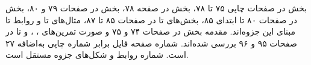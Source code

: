 بخش  در صفحات چاپی ۷۵ تا ۷۸، بخش  در صفحه ۷۸،
بخش  در صفحات ۷۹ و ۸۰، بخش  در صفحات ۸۰
تا ابتدای ۸۵، بخش‌های  تا  در صفحات ۸۵
تا ۸۷، مثال‌های  تا  و روابط
 تا  مبنای این جزوه‌اند.
مقدمه بخش  در صفحات ۷۴ و ۷۵ و صورت تمرین‌های ، ،  و
 تا  در صفحات ۹۵ و ۹۶ بررسی شده‌اند. شماره صفحه فایل 
برابر شماره چاپی به‌اضافه
۲۷ است. شماره روابط و شکل‌های جزوه مستقل است.
